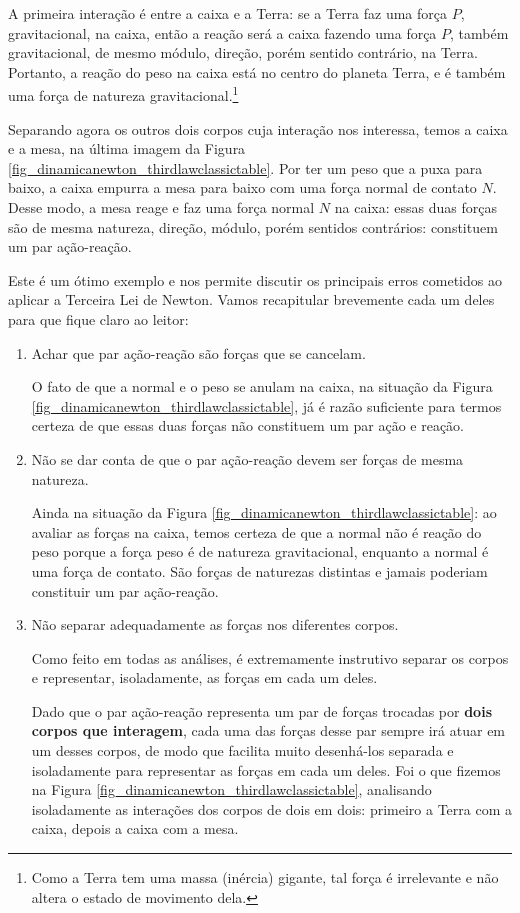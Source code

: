 A primeira interação é entre a caixa e a Terra: se a Terra faz uma força $P$, gravitacional, na caixa, então a reação será a caixa fazendo uma força $P$, também gravitacional, de mesmo módulo, direção, porém sentido contrário, na Terra. Portanto, a reação do peso na caixa está no centro do planeta Terra, e é também uma força de natureza gravitacional.\footnote{Como a Terra tem uma massa (inércia) gigante, tal força é irrelevante e não altera o estado de movimento dela.}

Separando agora os outros dois corpos cuja interação nos interessa, temos a caixa e a mesa, na última imagem da Figura \ref{fig_dinamicanewton_thirdlawclassictable}. Por ter um peso que a puxa para baixo, a caixa empurra a mesa para baixo com uma força normal de contato $N.$ Desse modo, a mesa reage e faz uma força normal $N$ na caixa: essas duas forças são de mesma natureza, direção, módulo, porém sentidos contrários: constituem um par ação-reação.


Este é um ótimo exemplo e nos permite discutir os principais erros cometidos ao aplicar a Terceira Lei de Newton. Vamos recapitular brevemente cada um deles para que fique claro ao leitor:


\begin{enumerate}
    \item Achar que par ação-reação são forças que se cancelam. 
    
    O fato de que a normal e o peso se anulam na caixa, na situação da Figura \ref{fig_dinamicanewton_thirdlawclassictable}, já é razão suficiente para termos certeza de que essas duas forças não constituem um par ação e reação. 

    \item Não se dar conta de que o par ação-reação devem ser forças de mesma natureza. 

    Ainda na situação da Figura \ref{fig_dinamicanewton_thirdlawclassictable}: ao avaliar as forças na caixa, temos certeza de que a normal não é reação do peso porque a força peso é de natureza gravitacional, enquanto a normal é uma força de contato. São forças de naturezas distintas e jamais poderiam constituir um par ação-reação.

    \item Não separar adequadamente as forças nos diferentes corpos.

    Como feito em todas as análises, é extremamente instrutivo separar os corpos e representar, isoladamente, as forças em cada um deles. 
    
    Dado que o par ação-reação representa um par de forças trocadas por \textbf{dois corpos que interagem}, cada uma das forças desse par sempre irá atuar em um desses corpos, de modo que facilita muito desenhá-los separada e isoladamente para representar as forças em cada um deles. Foi o que fizemos na Figura \ref{fig_dinamicanewton_thirdlawclassictable}, analisando isoladamente as interações dos corpos de dois em dois: primeiro a Terra com a caixa, depois a caixa com a mesa.


\end{enumerate}




